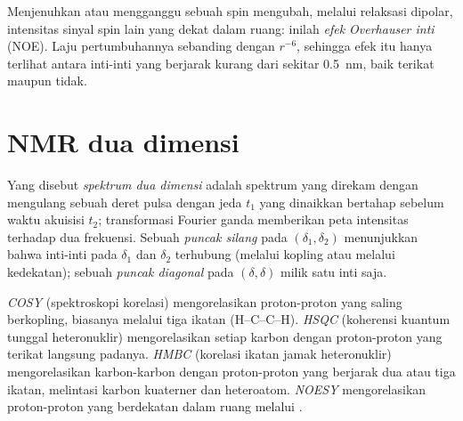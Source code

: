 \begin{definition}\label{def:b3:advanced-nmr:noe}
Menjenuhkan atau mengganggu sebuah spin mengubah, melalui relaksasi dipolar,
intensitas sinyal spin lain yang dekat dalam ruang: inilah \emph{efek
Overhauser inti} (NOE). Laju pertumbuhannya
sebanding dengan $r^{-6}$, sehingga efek itu hanya terlihat antara inti-inti
yang berjarak kurang dari sekitar \qty{0.5}{nm}, baik terikat maupun tidak.
\end{definition}

\section{NMR dua dimensi}

\begin{definition}\label{def:b3:advanced-nmr:two-d}
Yang disebut \emph{spektrum dua dimensi} adalah
spektrum yang direkam dengan mengulang sebuah deret pulsa dengan jeda $t_1$
yang dinaikkan bertahap sebelum waktu akuisisi $t_2$; transformasi Fourier
ganda memberikan peta intensitas terhadap dua frekuensi. Sebuah \emph{puncak
silang} pada $(\delta_1,
\delta_2)$ menunjukkan bahwa inti-inti pada $\delta_1$ dan $\delta_2$ terhubung
(melalui kopling atau melalui kedekatan); sebuah \emph{puncak
diagonal} pada $(\delta, \delta)$ milik satu inti saja.
\end{definition}

\begin{definition}\label{def:b3:advanced-nmr:experiments}
\emph{COSY} (spektroskopi korelasi) mengorelasikan proton-proton
yang saling berkopling, biasanya melalui tiga ikatan (H--C--C--H).
\emph{HSQC} (koherensi kuantum tunggal heteronuklir) mengorelasikan
setiap karbon dengan proton-proton yang terikat langsung padanya.
\emph{HMBC} (korelasi ikatan jamak heteronuklir) mengorelasikan
karbon-karbon dengan proton-proton yang berjarak dua atau tiga ikatan,
melintasi karbon kuaterner dan heteroatom. \emph{NOESY}
mengorelasikan proton-proton yang berdekatan dalam ruang melalui .
\end{definition}

